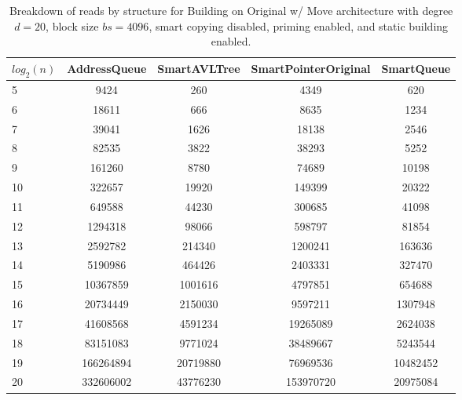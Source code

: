 \begin{table}[]
\centering
\begin{tabular}{|l|c|c|c|c|}
$log_2(n)$ & AddressQueue & SmartAVLTree & SmartPointerOriginal & SmartQueue \\ \hline
5 & 9424 & 260 & 4349 & 620 \\ \hline
6 & 18611 & 666 & 8635 & 1234 \\ \hline
7 & 39041 & 1626 & 18138 & 2546 \\ \hline
8 & 82535 & 3822 & 38293 & 5252 \\ \hline
9 & 161260 & 8780 & 74689 & 10198 \\ \hline
10 & 322657 & 19920 & 149399 & 20322 \\ \hline
11 & 649588 & 44230 & 300685 & 41098 \\ \hline
12 & 1294318 & 98066 & 598797 & 81854 \\ \hline
13 & 2592782 & 214340 & 1200241 & 163636 \\ \hline
14 & 5190986 & 464426 & 2403331 & 327470 \\ \hline
15 & 10367859 & 1001616 & 4797851 & 654688 \\ \hline
16 & 20734449 & 2150030 & 9597211 & 1307948 \\ \hline
17 & 41608568 & 4591234 & 19265089 & 2624038 \\ \hline
18 & 83151083 & 9771024 & 38489667 & 5243544 \\ \hline
19 & 166264894 & 20719880 & 76969536 & 10482452 \\ \hline
20 & 332606002 & 43776230 & 153970720 & 20975084 \\ \hline
\end{tabular}
\caption{Breakdown of reads by structure for Building on Original w/ Move architecture with degree $d=20$, block size $bs=4096$, smart copying disabled, priming enabled, and static building enabled.}
    \label{tab:reads_by_structure_build_d20_bs4096_copiesfalse_primetrue_staticinsertiontrue_ptoriginal_movetrue}
\end{table}

